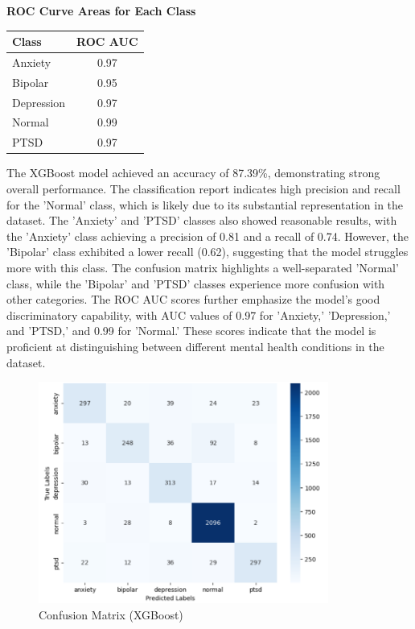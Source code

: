 \vspace{0.25em}

\begin{center}
    \textbf{ROC Curve Areas for Each Class} \\[0.5em]
    \begin{tabular}{|l|c|}
        \hline
        \textbf{Class}  & \textbf{ROC AUC} \\ \hline
        Anxiety         & 0.97            \\ \hline
        Bipolar         & 0.95            \\ \hline
        Depression      & 0.97            \\ \hline
        Normal          & 0.99            \\ \hline
        PTSD            & 0.97            \\ \hline
    \end{tabular}
\end{center}

\vspace{0.25em}

\noindent
The XGBoost model achieved an accuracy of 87.39\%, demonstrating strong overall performance. The classification report indicates high precision and recall for the 'Normal' class, which is likely due to its substantial representation in the dataset. The 'Anxiety' and 'PTSD' classes also showed reasonable results, with the 'Anxiety' class achieving a precision of 0.81 and a recall of 0.74. However, the 'Bipolar' class exhibited a lower recall (0.62), suggesting that the model struggles more with this class. The confusion matrix highlights a well-separated 'Normal' class, while the 'Bipolar' and 'PTSD' classes experience more confusion with other categories. The ROC AUC scores further emphasize the model's good discriminatory capability, with AUC values of 0.97 for 'Anxiety,' 'Depression,' and 'PTSD,' and 0.99 for 'Normal.' These scores indicate that the model is proficient at distinguishing between different mental health conditions in the dataset.

\begin{figure}[h!]  
    \centering
    \includegraphics[width=0.85\textwidth]{Images/XG Confusion Matrix.png}  
    \caption{Confusion Matrix (XGBoost)}
    \label{XGCM}  %
\end{figure}

